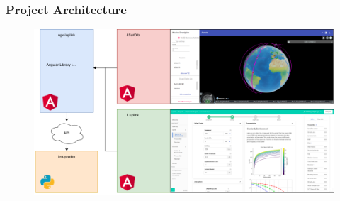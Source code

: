 \documentclass{beamer}
\begin{document}
\begin{frame}
	\frametitle{Project Architecture}
	\bigskip
	
	\begin{figure}
			\includegraphics[width=\textwidth]{architecture1.png}
		\end{figure}
	\begin{columns}[onlytextwidth]
		
		\begin{column}{0.45\textwidth}
			
		\end{column}
		
		\begin{column}{0.6\textwidth}
	
		\end{column}
		
		\hfill
	\end{columns}
\end{frame}
%	
%		
%		
%		
\end{document}
